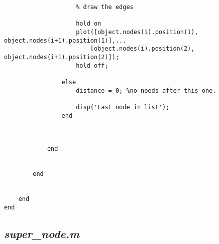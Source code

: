 \begin{lstlisting}
                    % draw the edges
                    
                    hold on
                    plot([object.nodes(i).position(1), object.nodes(i+1).position(1)],...
                        [object.nodes(i).position(2), object.nodes(i+1).position(2)]);
                    hold off;
                                        
                else
                    distance = 0; %no noeds after this one.
                    
                    disp('Last node in list');
                end
                
                
                
            end
            
            
        end
        
        
    end
end

\end{lstlisting}


\subsection{\emph{super\_node.m}}

